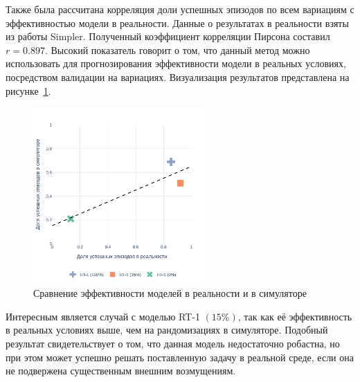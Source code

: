             Также была рассчитана корреляция доли успешных эпизодов по всем вариациям с эффективностью модели в реальности. Данные о результатах в реальности взяты из работы Simpler. Полученный коэффициент корреляции Пирсона составил $r = 0.897$. Высокий показатель говорит о том, что данный метод можно использовать для прогнозирования эффективности модели в реальных условиях, посредством валидации на вариациях. Визуализация результатов представлена на рисунке~\ref{fig:res}.

            \begin{figure}[h]
              \begin{center}
                  \includegraphics[width=0.6\textwidth]{images/plot.png}
              \caption{Сравнение эффективности моделей в реальности и в симуляторе}
              \label{fig:res}
              \end{center}
          \end{figure}

          Интересным является случай с моделью RT-1 $(15\%)$, так как её эффективность в реальных условиях выше, чем на рандомизациях в симуляторе. Подобный результат свидетельствует о том, что данная модель недостаточно робастна, но при этом может успешно решать поставленную задачу в реальной среде, если она не подвержена существенным внешним возмущениям. 